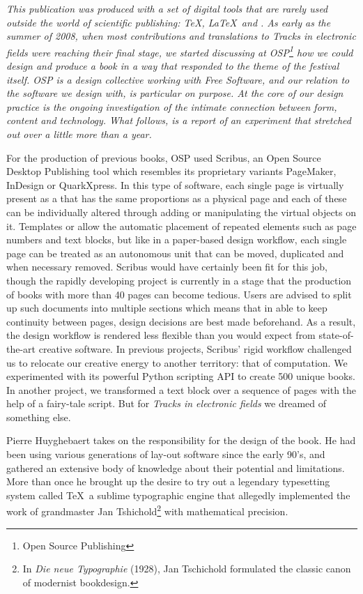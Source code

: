 \blank
{\em This publication was produced with a set of digital tools that are
rarely used outside the world of scientific publishing: \TeX, \LaTeX\ and \ConTeXt. As early as the summer of 2008, when most contributions and
translations to {\em Tracks in electronic fields} were reaching
their final stage, we started discussing at OSP\footnote{Open Source Publishing } how we could design and
produce a book in a way that responded to the theme of the festival
itself. OSP is a design collective working
with Free Software, and our relation to the software we design with, is
particular on purpose. At the core of our design practice is the
ongoing investigation of the intimate connection between form,
content and technology. What follows, is a report of an experiment that
stretched out over a little more than a year.}\par

For the production of previous books, OSP used Scribus, an Open Source
Desktop Publishing tool which resembles its proprietary variants
PageMaker, InDesign or QuarkXpress. In this type of software, each
single page is virtually present as a
 that has the same
proportions as a physical page and each of these
 can be individually altered
through adding or manipulating the virtual objects on it. Templates or
 allow the automatic
placement of repeated elements such as page numbers and text blocks,
but like in a paper-based design workflow, each single page can be
treated as an autonomous unit that can be moved, duplicated and when
necessary removed. Scribus would have certainly been fit for this job,
though the rapidly developing project is currently in a stage that the
production of books with more than 40 pages can become tedious. Users
are advised to split up such documents into multiple sections which
means that in able to keep continuity between pages, design decisions
are best made beforehand. As a result, the design workflow is rendered
less flexible than you would expect from state-of-the-art creative
software. In previous projects, Scribus' rigid
workflow challenged us to relocate our creative energy to another
territory: that of computation. We experimented with its powerful
Python scripting API to create 500 unique books. In another project,
we transformed a text block over a sequence of pages with the help of a
fairy-tale script. But for {\em Tracks in electronic fields} we
dreamed of something else.


Pierre Huyghebaert takes on the responsibility for the design of the
book. He had been using various generations of lay-out software since
the early 90's, and gathered an extensive body of
knowledge about their potential and limitations. More than once he
brought up the desire to try out a legendary typesetting system called
\TeX\, a sublime typographic engine that allegedly implemented the work
of grandmaster Jan Tshichold\footnote{In {\em Die neue Typographie}
(1928), Jan Tschichold formulated the classic canon of modernist
bookdesign.} with mathematical precision.



